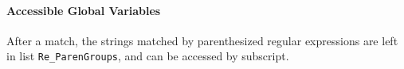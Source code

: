 \paragraph{Accessible Global Variables}
After a match, the strings matched by parenthesized regular expressions
are left in list \texttt{Re\_ParenGroups}, and can be accessed by
subscript.






